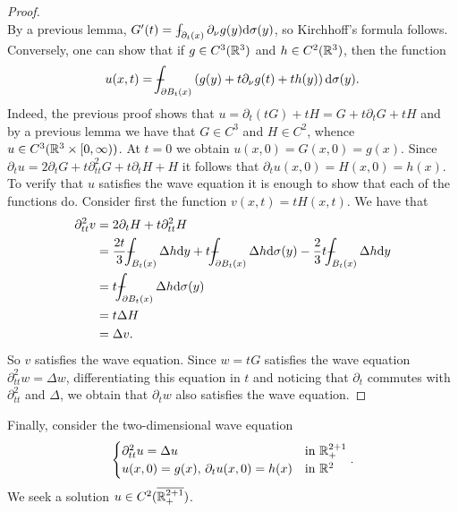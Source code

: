 \documentclass[11pt]{article}
\begin{document}
\begin{proof}
\begin{equation*}
					\end{equation*} 
					By a previous lemma, $G^\prime(t)=\dashint_{\partial_t(x)}\partial_\nu g(y)\mathrm{d}\sigma(y)$, so Kirchhoff's formula follows. Conversely, one can show that if $g\in C^3(\mathbb{R}^3)$ and $h\in C^2(\mathbb{R}^3)$, then the function 
					\begin{equation*}
						u(x,t)=\dashint_{\partial B_t(x)}\left(g(y)+t\partial_\nu g(t)+th(y)\right)\mathrm{d}\sigma(y).
					\end{equation*}
					Indeed, the previous proof shows that $u=\partial_t(tG)+tH=G+t\partial_tG+tH$ and by a previous lemma we have that $G\in C^3$ and $H\in C^2$, whence $u\in C^3(\mathbb{R}^3\times[0,\infty))$. At $t=0$ we obtain $u(x,0)=G(x,0)=g(x)$. Since $\partial_tu=2\partial_tG+t\partial_{tt}^2G+t\partial_tH+H$ it follows that $\partial_tu(x,0)=H(x,0)=h(x)$. To verify that $u$ satisfies the wave equation it is enough to show that each of the functions do. Consider first the function $v(x,t)=tH(x,t)$. We have that
					\begin{align*}
						\partial_{tt}^2v&=2\partial_tH+t\partial_{tt}^2H\\
						&=\frac{2t}{3}\dashint_{B_t(x)}\Delta h \mathrm{d}y+t\dashint_{\partial B_t(x)}\Delta h \mathrm{d}\sigma(y)-\frac{2}{3}t\dashint_{B_t(x)}\Delta h \mathrm{d}y\\
						&=t\dashint_{\partial B_t(x)}\Delta h \mathrm{d}\sigma(y)\\
						&=t\Delta H\\
						&=\Delta v.
					\end{align*}
					So $v$ satisfies the wave equation. Since $w=tG$ satisfies the wave equation $\partial_{tt}^2w=\Delta w$, differentiating this equation in $t$ and noticing that $\partial_t$ commutes with $\partial_{tt}^2$ and $\Delta$, we obtain that $\partial_tw$ also satisfies the wave equation.
				\end{proof}

				Finally, consider the two-dimensional wave equation
				\begin{equation}\label{eq--wave2d}
					\begin{cases}
						\partial_{tt}^2u=\Delta u & \text{in }\mathbb{R}^{2+1}_+\\
						u(x,0)=g(x),\,\partial_tu(x,0)=h(x) & \text{in }\mathbb{R}^2
					\end{cases}. 
				\end{equation}
				We seek a solution $u\in C^2(\overline{\mathbb{R}^{2+1}_+})$.
\end{document}
